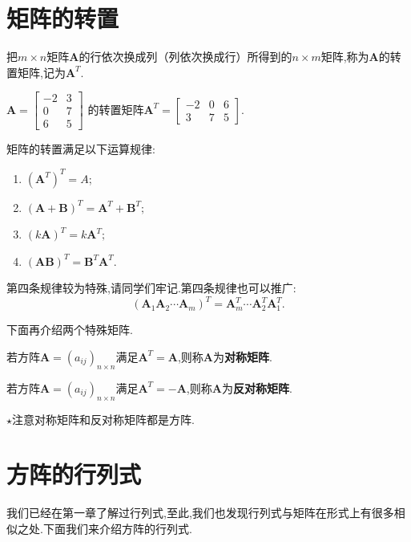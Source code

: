 \section{矩阵的转置}
\begin{definition}
	把$m\times n$矩阵$\mathbf{A}$的行依次换成列（列依次换成行）所得到的$n\times m$矩阵,称为$\mathbf{A}$的转置矩阵,记为$\mathbf{A}^T$.
\end{definition}

\begin{example}
	$\mathbf{A}=\begin{bmatrix}
			-2 & 3 \\
			0  & 7 \\
			6  & 5
		\end{bmatrix}$
	的转置矩阵$\mathbf{A}^T=
		\begin{bmatrix}
			-2 & 0 & 6 \\
			3  & 7 & 5
		\end{bmatrix}.$
\end{example}

矩阵的转置满足以下运算规律:
\begin{enumerate}
	\item $(\mathbf{A}^T)^T=A$;
	\item $\mathbf{(A+B)}^T=\mathbf{A}^T+\mathbf{B}^T;$
	\item $(k\mathbf{A})^T=k\mathbf{A}^T;$
	\item $(\mathbf{AB})^T=\mathbf{B}^T\mathbf{A}^T.$
\end{enumerate}
第四条规律较为特殊,请同学们牢记.第四条规律也可以推广:
\[
	(\mathbf{A}_1\mathbf{A}_2\cdots \mathbf{A}_m)^T=\mathbf{A}_{m}^{T}\cdots \mathbf{A}_{2}^{T}\mathbf{A}_{1}^{T}.
\]

下面再介绍两个特殊矩阵.
\begin{definition}
	若方阵$\mathbf{A}=(a_{ij})_{n\times n}$满足$\mathbf{A}^T=\mathbf{A}$,则称$\mathbf{A}$为\textbf{对称矩阵}.
\end{definition}

\begin{definition}
	若方阵$\mathbf{A}=(a_{ij})_{n\times n}$满足$\mathbf{A}^T=-\mathbf{A}$,则称$\mathbf{A}$为\textbf{反对称矩阵}.
\end{definition}
$\star$注意对称矩阵和反对称矩阵都是方阵.

\section{方阵的行列式}
我们已经在第一章了解过行列式,至此,我们也发现行列式与矩阵在形式上有很多相似之处.下面我们来介绍方阵的行列式.

